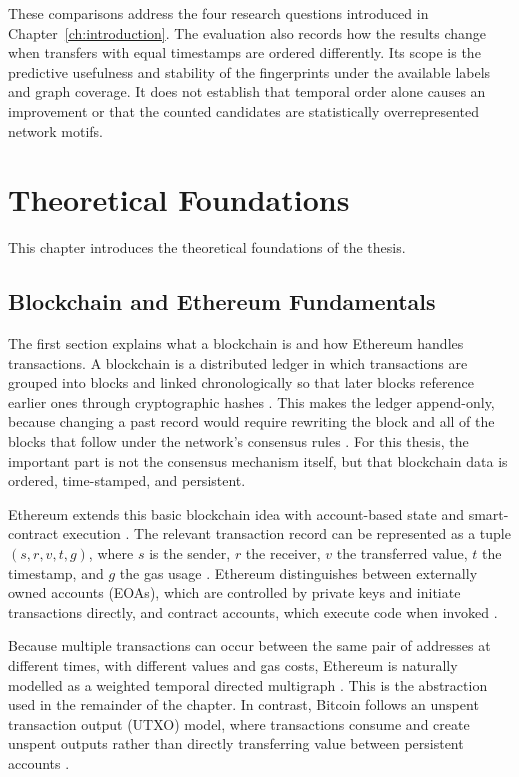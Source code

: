\documentclass{thesisclass}
\begin{document}
These comparisons address the four research questions introduced in
Chapter~\ref{ch:introduction}. The evaluation also records how the results
change when transfers with equal timestamps are ordered differently. Its scope
is the predictive usefulness and stability of the fingerprints under the
available labels and graph coverage. It does not establish that temporal order
alone causes an improvement or that the counted candidates are statistically
overrepresented network motifs.

\chapter{Theoretical Foundations}
\label{ch:foundations}
This chapter introduces the theoretical foundations of the thesis.

\section{Blockchain and Ethereum Fundamentals}
The first section explains what a blockchain is and how Ethereum handles transactions.
A blockchain is a distributed ledger in which transactions are grouped into blocks and linked chronologically so that later blocks reference earlier ones through cryptographic hashes \citep{nakamoto2008bitcoin, buterin2014ethereum}. This makes the ledger append-only, because changing a past record would require rewriting the block and all of the blocks that follow under the network’s consensus rules \citep{nakamoto2008bitcoin}. For this thesis, the important part is not the consensus mechanism itself, but that blockchain data is ordered, time-stamped, and persistent.

Ethereum extends this basic blockchain idea with account-based state and smart-contract execution \citep{buterin2014ethereum}. The relevant transaction record can be represented as a tuple $(s,r,v,t,g)$, where $s$ is the sender, $r$ the receiver, $v$ the transferred value, $t$ the timestamp, and $g$ the gas usage \citep{alemari2021labeled, sanjalawe2023atd}. Ethereum distinguishes between externally owned accounts (EOAs), which are controlled by private keys and initiate transactions directly, and contract accounts, which execute code when invoked \citep{buterin2014ethereum, alemari2021labeled}.

Because multiple transactions can occur between the same pair of addresses at different times, with different values and gas costs, Ethereum is naturally modelled as a weighted temporal directed multigraph \citep{kovanen2011temporal, paranjape2017motifs}. This is the abstraction used in the remainder of the chapter. In contrast, Bitcoin follows an unspent transaction output (UTXO) model, where transactions consume and create unspent outputs rather than directly transferring value between persistent accounts \citep{nakamoto2008bitcoin}.
\end{document}
